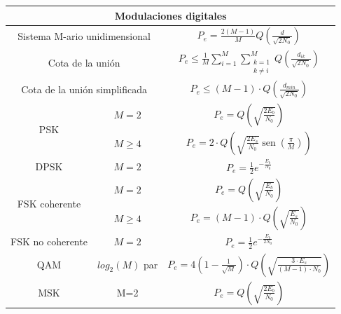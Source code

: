 \documentclass[es]{article}
\DeclareMathOperator{\sen}{sen}
\begin{document}
\begin{center}
    \renewcommand{\arraystretch}{2.2}
        \begin{tabular}{|c|c|c|}
            \multicolumn{3}{c}{{\bf Modulaciones digitales}}\\
            \hline
            \multicolumn{2}{|c|}{Sistema M-ario unidimensional} & $P_e = \displaystyle\frac{2(M-1)}{M} Q \left ( \displaystyle\frac{d}{\sqrt{2 N_0}} \right ) $\\[1ex]
            \hline
            \multicolumn{2}{|c|}{Cota de la unión} & $P_e \leq \displaystyle\frac{1}{M} \displaystyle\sum\limits_{i=1}^{M} \displaystyle\sum\limits_{\substack{k=1 \\ k\neq i}}^{M} Q \left ( \displaystyle\frac{d_{ik}}{\sqrt{2 N_0}} \right )$ \\ [1ex]
            \hline
            \multicolumn{2}{|c|}{Cota de la unión simplificada} & $P_e \leq (M-1) \cdot Q \left ( \displaystyle\frac{d_{min}}{\sqrt{2 N_0}} \right )$ \\[1ex]
            \hline
            \multirow{2}{*}{PSK} & $M=2$ & $P_e = Q\left ( \displaystyle\sqrt{\displaystyle\frac{2 E_b}{N_0}} \right)$ \\[1ex]
            \cline{2-3}
            & $M \geq 4$ & $P_e = 2 \cdot Q\left ( \sqrt{\displaystyle\frac{2 E_s}{N_0}} \sen\left ( \displaystyle\frac{\pi}{M} \right)  \right)$ \\
            \hline
            DPSK & $M=2$ & $P_e = \displaystyle\frac{1}{2} e^{-\displaystyle\frac{E_b}{N_0}}$ \\
            \hline
            \multirow{2}{*}{FSK coherente} & $M=2$ & $P_e = Q\left ( \sqrt{\displaystyle\frac{E_b}{N_0}} \right)$ \\
            \cline{2-3}
            & $M\geq 4$ & $P_e = (M-1) \cdot Q\left ( \sqrt{\displaystyle\frac{E_s}{N_0}} \right)$ \\
            \hline
            FSK no coherente & $M=2$ & $P_e = \displaystyle\frac{1}{2} e^{-\displaystyle\frac{E_b}{2 N_0}}$ \\
            \hline
            QAM & $log_2(M)$ par & $P_e = 4 \left ( 1 - \displaystyle\frac{1}{\sqrt{M}} \right ) \cdot Q\left ( \sqrt{\displaystyle\frac{3 \cdot E_s}{(M-1) \cdot N_0}} \right)$ \\
            \hline
            MSK & M=2 & $P_e = Q\left ( \displaystyle\sqrt{\displaystyle\frac{2 E_b}{N_0}} \right)$ \\
            \hline
        \end{tabular}
        \renewcommand{\arraystretch}{1}
        \vspace{0.5cm}





\end{center}
\end{document}
